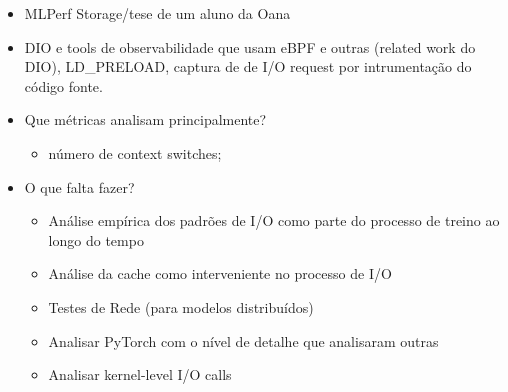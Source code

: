 \documentclass[conference]{IEEEtran}
\begin{document}
\begin{itemize}
	\item MLPerf Storage/tese de um aluno da Oana
	\item DIO e tools de observabilidade que usam eBPF e outras (related work do DIO), LD\_PRELOAD, captura de de I/O request por intrumentação do código fonte.
	\item Que métricas analisam principalmente?
	      \begin{itemize}
		      \item número de context switches;
	      \end{itemize}
	\item O que falta fazer?
	      \begin{itemize}
		      \item Análise empírica dos padrões de I/O como parte do processo de treino ao longo do tempo
		      \item Análise da cache como interveniente no processo de I/O
		      \item Testes de Rede (para modelos distribuídos)
		      \item Analisar PyTorch com o nível de detalhe que analisaram outras
		      \item Analisar kernel-level I/O calls
	      \end{itemize}
\end{itemize}
\end{document}
